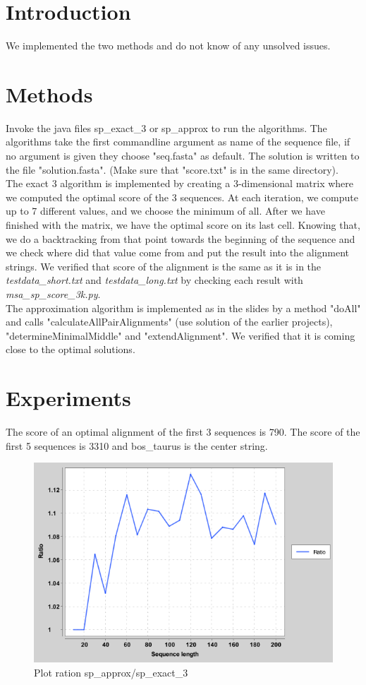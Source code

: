 \documentclass[12pt,a4paper]{article}
\begin{document}
	\section{Introduction}
	We implemented the two methods and do not know of any unsolved issues.

	\section{Methods}
	Invoke the java files sp\_exact\_3 or sp\_approx to run the algorithms. The algorithms take the first commandline argument as name of the sequence file, if no argument is given they choose "seq.fasta" as default. The solution is written to the file "solution.fasta". (Make sure that "score.txt" is in the same directory).
	\\
	The exact 3 algorithm is implemented by creating a 3-dimensional matrix where we computed the optimal score of the 3 sequences. At each iteration, we compute up to 7 different values, and we choose the minimum of all. After we have finished with the matrix, we have the optimal score on its last cell. Knowing that, we do a backtracking from that point towards the beginning of the sequence and we check where did that value come from and put the result into the alignment strings. We verified that score of the alignment is the same as it is in the \textit{testdata\_short.txt} and \textit{testdata\_long.txt} by checking each result with \textit{msa_sp_score_3k.py}.
	\\
	The approximation algorithm is implemented as in the slides by a method "doAll" and calls "calculateAllPairAlignments" (use solution of the earlier projects), "determineMinimalMiddle" and "extendAlignment". We verified that it is coming close to the optimal solutions.

	\section{Experiments}

	The score of an optimal alignment of the first 3 sequences is 790.
	The score of the first 5 sequences is 3310 and bos\_taurus is the center string.
	\\
	\begin{figure}[h]
  \includegraphics[width=\linewidth]{plotRatio.png}
  \caption{Plot ration sp\_approx/sp\_exact\_3}
  \label{fig:microservQuestion}
\end{figure}
	
\end{document}

